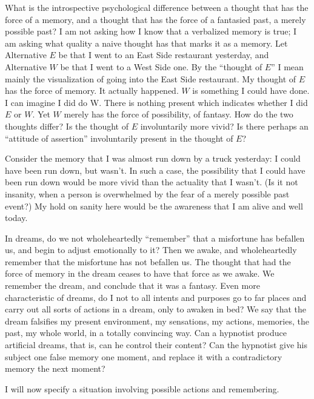 What is the introspective psychological difference between a thought 
that has the force of a memory, and a thought that has the force of a 
fantasied past, a merely possible past? I am not asking how I know that a 
verbalized memory is true; I am asking what quality a naive thought has that 
marks it as a memory. Let Alternative $E$ be that I went to an East Side 
restaurant yesterday, and Alternative $W$ be that I went to a West Side one. 
By the \enquote{thought of $E$} I mean mainly the visualization of going into the East 
Side restaurant. My thought of $E$ has the force of memory. It actually 
happened. $W$ is something I could have done. I can imagine I did do W. There 
is nothing present which indicates whether I did $E$ or $W$. Yet $W$ merely has 
the force of possibility, of fantasy. How do the two thoughts differ? Is the 
thought of $E$ involuntarily more vivid? Is there perhaps an \enquote{attitude of 
assertion} involuntarily present in the thought of $E$? 

Consider the memory that I was almost run down by a truck yesterday: 
I could have been run down, but wasn't. In such a case, the possibility that I 
could have been run down would be more vivid than the actuality that I 
wasn't. (Is it not insanity, when a person is overwhelmed by the fear of a 
merely possible past event?) My hold on sanity here would be the awareness 
that I am alive and well today. 

In dreams, do we not wholeheartedly \enquote{remember} that a misfortune 
has befallen us, and begin to adjust emotionally to it? Then we awake, and 
wholeheartedly remember that the misfortune has not befallen us. The 
thought that had the force of memory in the dream ceases to have that force 
as we awake. We remember the dream, and conclude that it was a fantasy. 
Even more characteristic of dreams, do I not to all intents and purposes go 
to far places and carry out all sorts of actions in a dream, only to awaken in 
bed? We say that the dream falsifies my present environment, my 
sensations, my actions, memories, the past, my whole world, in a totally 
convincing way. Can a hypnotist produce artificial dreams, that is, can he 
control their content? Can the hypnotist give his subject one false memory 
one moment, and replace it with a contradictory memory the next 
moment? 

I will now specify a situation involving possible actions and 
remembering. 

\newenvironment{hangers}{\vskip 0.5em\begin{hangparas}{3em}{1}}{\end{hangparas}\vskip 0.5em}

